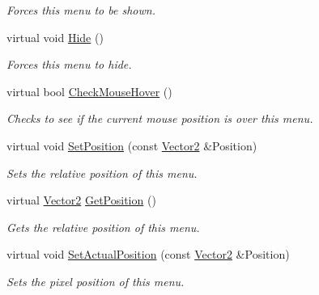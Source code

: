 \begin{DoxyCompactItemize}
\begin{DoxyCompactList}\small\item\em Forces this menu to be shown. \item\end{DoxyCompactList}\item 
\hypertarget{classphys_1_1UI_1_1Menu_a23f7b18c8bae528dc15bf8f3ff40d435}{
virtual void \hyperlink{classphys_1_1UI_1_1Menu_a23f7b18c8bae528dc15bf8f3ff40d435}{Hide} ()}
\label{classphys_1_1UI_1_1Menu_a23f7b18c8bae528dc15bf8f3ff40d435}

\begin{DoxyCompactList}\small\item\em Forces this menu to hide. \item\end{DoxyCompactList}\item 
virtual bool \hyperlink{classphys_1_1UI_1_1Menu_af2514d2614322856f604be2e167d0872}{CheckMouseHover} ()
\begin{DoxyCompactList}\small\item\em Checks to see if the current mouse position is over this menu. \item\end{DoxyCompactList}\item 
virtual void \hyperlink{classphys_1_1UI_1_1Menu_a53ff13bb9b850fb8196c1c0c637afbd5}{SetPosition} (const \hyperlink{classphys_1_1Vector2}{Vector2} \&Position)
\begin{DoxyCompactList}\small\item\em Sets the relative position of this menu. \item\end{DoxyCompactList}\item 
virtual \hyperlink{classphys_1_1Vector2}{Vector2} \hyperlink{classphys_1_1UI_1_1Menu_a3c19fe2596fe4049325cc580daa70387}{GetPosition} ()
\begin{DoxyCompactList}\small\item\em Gets the relative position of this menu. \item\end{DoxyCompactList}\item 
virtual void \hyperlink{classphys_1_1UI_1_1Menu_a1d5434382755df214b169d3e9901c1e1}{SetActualPosition} (const \hyperlink{classphys_1_1Vector2}{Vector2} \&Position)
\begin{DoxyCompactList}\small\item\em Sets the pixel position of this menu. \item\end{DoxyCompactList}\item 

\end{DoxyCompactItemize}
